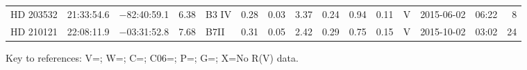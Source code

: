 \begin{tiny}
\begin{longtable}{lrrrll@{$\,\pm$\,}rl@{$\,\pm$\,}rl@{$\,\pm$\,}rcrrr}
HD 203532     &21:33:54.6&  $-$82:40:59.1&        6.38&  B3 IV          & 0.28 & 0.03   &    3.37 & 0.24 &      0.94 & 0.11 &    V  &2015-06-02 &06:22&    8\\  %
HD 210121     &22:08:11.9&  $-$03:31:52.8&        7.68&  B7II           & 0.31 & 0.05   &    2.42 & 0.29 &      0.75 & 0.15 &    V  &2015-10-02 &03:02&   24\\  %
\hline
\end{longtable}
\end{tiny}

\noindent
Key to references: 
V=\citet{Valetal04}; W=\citet{Wegner03}; C=\citet{Caretal05};
C06=\citet{Coxetal06}; P=\citet{Patetal03}; G=\citet{Goretal03}; 
X=No R(V) data.









    
    
	 
    
	 
     
    
	 
    
    
    
    
    


